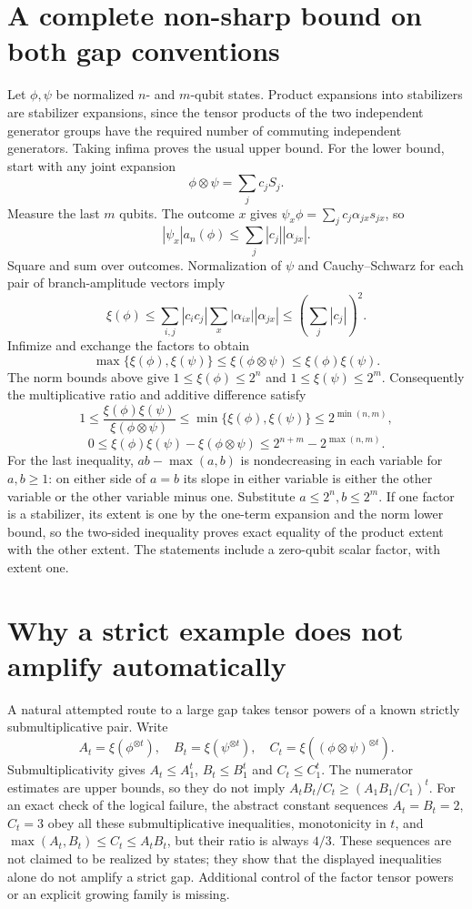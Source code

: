 \documentclass[11pt]{article}
\begin{document}
\section{A complete non-sharp bound on both gap conventions}
Let $\phi,\psi$ be normalized $n$- and $m$-qubit states. Product
expansions into stabilizers are stabilizer expansions, since the
tensor products of the two independent generator groups have
the required number of commuting independent generators.
Taking infima proves the usual upper bound. For the lower bound,
start with any joint expansion
\[
 \phi\otimes\psi=\sum_j c_jS_j.
\]
Measure the last $m$ qubits. The outcome $x$ gives
$\psi_x\phi=\sum_jc_j\alpha_{jx}s_{jx}$, so
\[
 |\psi_x|a_n(\phi)\le\sum_j|c_j||\alpha_{jx}|.
\]
Square and sum over outcomes. Normalization of $\psi$ and
Cauchy--Schwarz for each pair of branch-amplitude vectors imply
\[
 \xi(\phi)\le
 \sum_{i,j}|c_ic_j|\sum_x|\alpha_{ix}||\alpha_{jx}|
 \le\left(\sum_j|c_j|\right)^2.
\]
Infimize and exchange the factors to obtain
\[
 \max\{\xi(\phi),\xi(\psi)\}
 \le\xi(\phi\otimes\psi)\le\xi(\phi)\xi(\psi).
\]
The norm bounds above give $1\le\xi(\phi)\le2^n$ and
$1\le\xi(\psi)\le2^m$. Consequently the multiplicative ratio
and additive difference satisfy
\[
 1\le\frac{\xi(\phi)\xi(\psi)}{\xi(\phi\otimes\psi)}
 \le\min\{\xi(\phi),\xi(\psi)\}\le2^{\min(n,m)},
\]
\[
 0\le\xi(\phi)\xi(\psi)-\xi(\phi\otimes\psi)
 \le2^{n+m}-2^{\max(n,m)}.
\]
For the last inequality, $ab-\max(a,b)$ is nondecreasing in
each variable for $a,b\ge1$: on either side of $a=b$ its
slope in either variable is either the other variable or the other
variable minus one. Substitute $a\le2^n,b\le2^m$.
If one factor is a stabilizer, its extent is one by the one-term
expansion and the norm lower bound, so the two-sided inequality
proves exact equality of the product extent with the other extent.
The statements include a zero-qubit scalar factor, with extent one.

\section{Why a strict example does not amplify automatically}
A natural attempted route to a large gap takes tensor powers of
a known strictly submultiplicative pair. Write
\[
 A_t=\xi(\phi^{\otimes t}),\quad
 B_t=\xi(\psi^{\otimes t}),\quad
 C_t=\xi((\phi\otimes\psi)^{\otimes t}).
\]
Submultiplicativity gives $A_t\le A_1^t$, $B_t\le B_1^t$ and
$C_t\le C_1^t$. The numerator estimates are upper bounds, so
they do not imply $A_tB_t/C_t\ge(A_1B_1/C_1)^t$.
For an exact check of the logical failure, the abstract constant
sequences $A_t=B_t=2$, $C_t=3$ obey all these submultiplicative
inequalities, monotonicity in $t$, and
$\max(A_t,B_t)\le C_t\le A_tB_t$, but their ratio is always
$4/3$. These sequences are not claimed to be realized by states;
they show that the displayed inequalities alone do not amplify
a strict gap. Additional control of the factor tensor powers or
an explicit growing family is missing.
\end{document}
